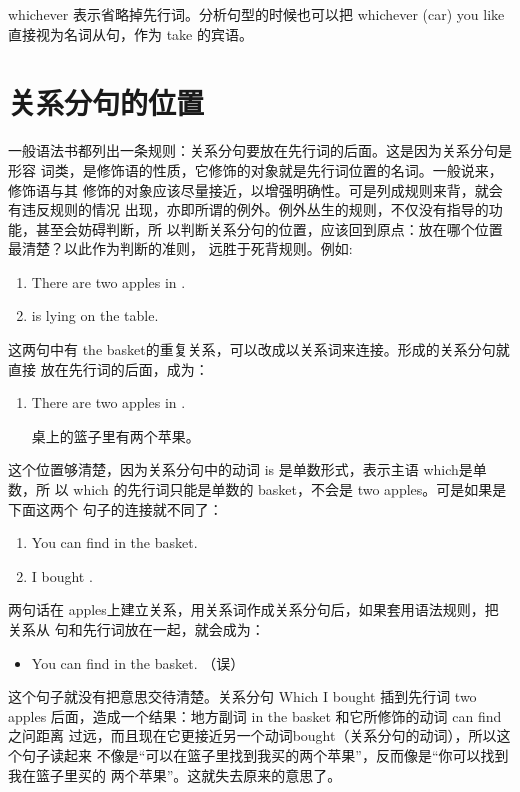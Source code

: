 whichever 表示省略掉先行词。分析句型的时候也可以把 whichever (car) you like
直接视为名词从句，作为 take 的宾语。

\section{关系分句的位置}

一般语法书都列出一条规则：关系分句要放在先行词的后面。这是因为关系分句是形容
词类，是修饰语的性质，它修饰的对象就是先行词位置的名词。一般说来，修饰语与其
修饰的对象应该尽量接近，以增强明确性。可是列成规则来背，就会有违反规则的情况
出现，亦即所谓的例外。例外丛生的规则，不仅没有指导的功能，甚至会妨碍判断，所
以判断关系分句的位置，应该回到原点：放在哪个位置最清楚？以此作为判断的准则，
远胜于死背规则。例如:

\begin{enumerate}
\item There are two apples in .
\item {} is lying on the table.
\end{enumerate}
这两句中有 the basket的重复关系，可以改成以关系词来连接。形成的关系分句就直接
放在先行词的后面，成为：
\begin{enumerate}[resume]
\item There are two apples in  .

  桌上的篮子里有两个苹果。
\end{enumerate}
这个位置够清楚，因为关系分句中的动词 is 是单数形式，表示主语 which是单数，所
以 which 的先行词只能是单数的 basket，不会是 two apples。可是如果是下面这两个
句子的连接就不同了：
\begin{enumerate}
\item You can find  in the basket.
\item I bought .
\end{enumerate}

两句话在 apples上建立关系，用关系词作成关系分句后，如果套用语法规则，把关系从
句和先行词放在一起，就会成为：
\begin{itemize}
\item You can find 
   in the basket. （误）
\end{itemize}
这个句子就没有把意思交待清楚。关系分句 Which I bought 插到先行词 two apples
后面，造成一个结果：地方副词 in the basket 和它所修饰的动词 can find 之问距离
过远，而且现在它更接近另一个动词bought（关系分句的动词），所以这个句子读起来
不像是“可以在篮子里找到我买的两个苹果”，反而像是“你可以找到我在篮子里买的
两个苹果”。这就失去原来的意思了。

